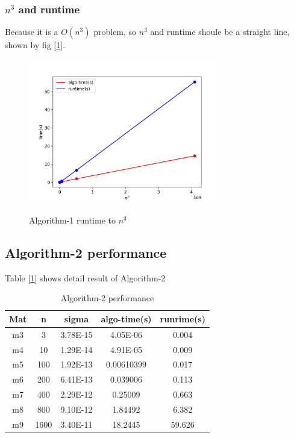 \documentclass{article}
\begin{document}
\subsubsection{$n^3$ and runtime}
Because it is a $O(n^3)$ problem, so $n^3$ and runtime shoule be a straight line, shown by fig [\ref{fig:algo1-runtime}].
\begin{figure}[H]
    \centering
    \caption{Algorithm-1 runtime to $n^3$}
    \includegraphics[width=0.75\textwidth]{src/algo1-runtime.png}
    \label{fig:algo1-runtime}
\end{figure}

\subsection{Algorithm-2 performance}
Table [\ref{tab:algo2}] shows detail result of Algorithm-2
\begin{table}[h]
    \centering
    \caption{Algorithm-2 performance}
    \begin{tabular}{|c|c|c|c|c|}
        \hline
        Mat & \multicolumn{1}{c|}{n} & \multicolumn{1}{c|}{sigma} & \multicolumn{1}{c|}{algo-time(s)} & \multicolumn{1}{c|}{runrime(s)} \bigstrut\\
        \hline
        m3  & 3   & 3.78E-15 & 4.05E-06 & 0.004 \bigstrut\\
        \hline
        m4  & 10  & 1.29E-14 & 4.91E-05 & 0.009 \bigstrut\\
        \hline
        m5  & 100 & 1.92E-13 & 0.00610399 & 0.017 \bigstrut\\
        \hline
        m6  & 200 & 6.41E-13 & 0.039006 & 0.113 \bigstrut\\
        \hline
        m7  & 400 & 2.29E-12 & 0.25009 & 0.663 \bigstrut\\
        \hline
        m8  & 800 & 9.10E-12 & 1.84492 & 6.382 \bigstrut\\
        \hline
        m9  & 1600 & 3.40E-11 & 18.2445 & 59.626 \bigstrut\\
        \hline
    \end{tabular}%

    \label{tab:algo2}
\end{table}%
\end{document}
